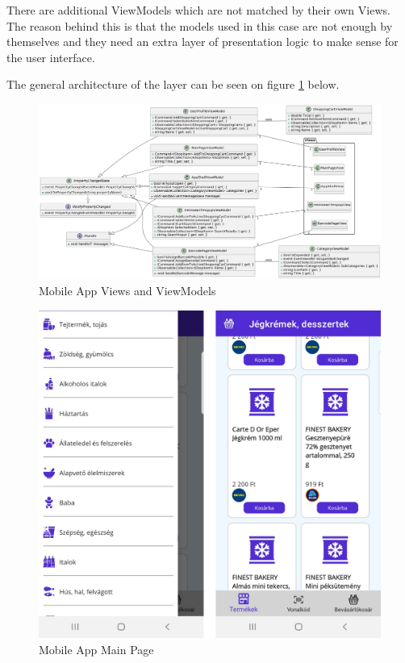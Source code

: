 There are additional ViewModels which are not matched by their own Views. The reason behind this is that the models used in this case are not enough by themselves and they need an extra layer of presentation logic to make sense for the user interface.

The general architecture of the layer can be seen on figure \ref{fig:appviewmodels} below.

\begin{figure}[H]
	\centering
	\includegraphics[width=1\linewidth]{img/app_viewmodels.png}
	\caption{Mobile App Views and ViewModels}
	\label{fig:appviewmodels}
\end{figure}


\begin{figure}[H]
	\centering
	\includegraphics[width=0.6\linewidth]{img/app_itemspage.png}
	\caption{Mobile App Main Page}
	\label{fig:appitemspage}
\end{figure}

